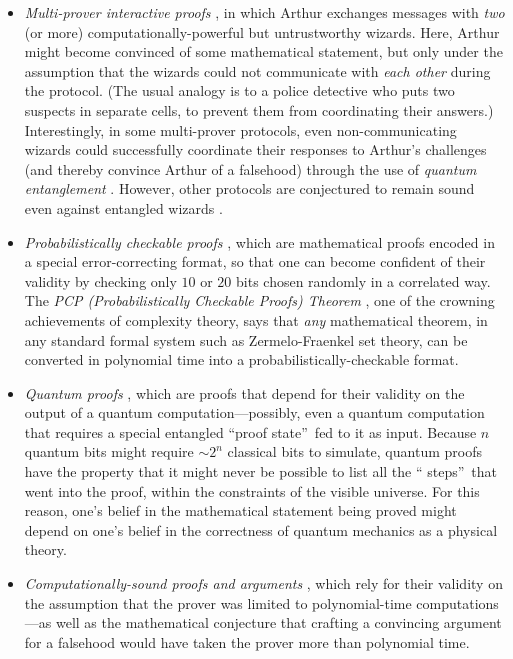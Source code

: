 \documentclass[12pt,onecolumn]{article}%
\begin{document}
\begin{itemize}
\item \textit{Multi-prover interactive proofs} \cite{bgkw,bfl}, in which
Arthur exchanges messages with \textit{two} (or more) computationally-powerful
but untrustworthy wizards. Here, Arthur might become convinced of some
mathematical statement, but only under the assumption that the wizards could
not communicate with \textit{each other} during the protocol. (The usual
analogy is to a police detective who puts two suspects in separate cells, to
prevent them from coordinating their answers.) Interestingly, in some
multi-prover protocols, even non-communicating wizards could successfully
coordinate their responses to Arthur's challenges (and thereby convince Arthur
of a falsehood) through the use of \textit{quantum entanglement}
\cite{chtw}. However, other protocols are conjectured to remain sound even
against entangled wizards \cite{kkmtv}.

\item \textit{Probabilistically checkable proofs} \cite{fglss,arorasafra},
which are mathematical proofs encoded in a special error-correcting format, so
that one can become confident of their validity by checking only $10$ or
$20$ bits chosen randomly in a correlated way. The \textit{PCP
(Probabilistically Checkable Proofs) Theorem} \cite{almss,dinur}, one of the
crowning achievements of complexity theory, says that \textit{any}
mathematical theorem, in any standard formal system such as Zermelo-Fraenkel
set theory, can be converted in polynomial time into a
probabilistically-checkable format.

\item \textit{Quantum proofs} \cite{watrous,ak}, which are proofs that depend
for their validity on the output of a quantum computation---possibly, even a
quantum computation that requires a special entangled \textquotedblleft proof
state\textquotedblright\  fed to it as input. Because $n$ quantum bits might
require $\sim2^{n}$ classical bits to simulate, quantum proofs have the
property that it might never be possible to list all the \textquotedblleft
steps\textquotedblright\  that went into the proof, within the constraints of
the visible universe. For this reason, one's belief in the mathematical
statement being proved might depend on one's belief in the correctness of
quantum mechanics as a physical theory.

\item \textit{Computationally-sound proofs and arguments} \cite{bcc,micali},
which rely for their validity on the assumption that the prover was limited to
polynomial-time computations---as well as the mathematical conjecture that
crafting a convincing argument for a falsehood would have taken the prover
more than polynomial time.
\end{itemize}
\end{document}
